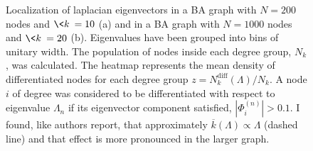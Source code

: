 \begin{figure}[H]
    \centering
{}
\caption{Localization of laplacian eigenvectors in a BA graph with $N=200$ nodes and $\<k\>=10$ (a) and in a BA graph with $N=1000$ nodes and $\<k\>=20$ (b). Eigenvalues have been grouped into bins of unitary width. The population of nodes inside each degree group, $N_k$, was calculated. The heatmap represents the mean density of differentiated nodes for each degree group $z = N_k^{\text{diff}}(\Lambda)/N_k$. A node $i$ of degree was considered to be differentiated with respect to eigenvalue $\Lambda_n$ if its eigenvector component satisfied, $|\Phi_i^{(n)}|> 0.1$. I found, like authors \cite{main_network} report, that approximately $\overline{k}(\Lambda) \propto \Lambda$ (dashed line) and that effect is more pronounced in the larger graph.}
\label{fig:heatmap}
\end{figure}
